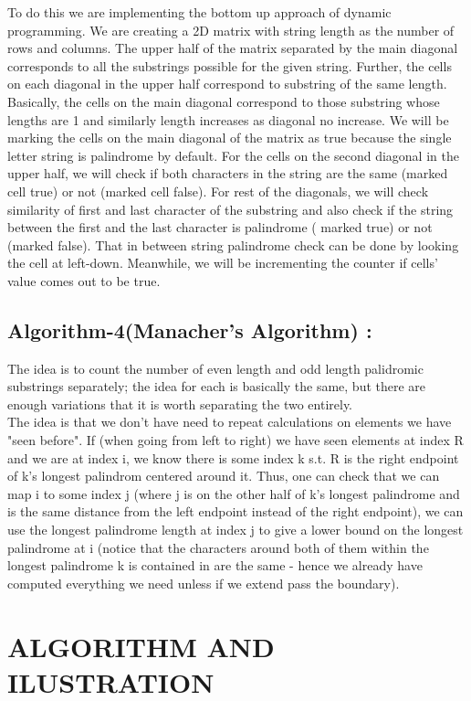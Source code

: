 \documentclass[conference]{IEEEtran}
\begin{document}
To do this we are implementing the bottom up approach of dynamic programming. We are creating a 2D matrix with string length as the number of rows and columns. The upper half of the matrix separated by the main diagonal corresponds to all the substrings possible for the given string. Further, the cells on each diagonal in the upper half correspond to substring of the same length. Basically, the cells on the main diagonal correspond to those substring whose lengths are 1 and similarly length increases as diagonal no increase. We will be marking the cells on the main diagonal of the matrix as true because the single letter string is palindrome by default. For the cells on the second diagonal in the upper half, we will check if both characters in the string are the same (marked cell true) or not (marked cell false). For rest of the diagonals, we will check similarity of first and last character of the substring and also check if the string
between the first and the last character is palindrome ( marked true) or not (marked false). That in between string palindrome check can be done by looking the cell at left-down. Meanwhile, we will be incrementing the counter if cells’ value comes out to be true.

\bigskip\subsection{Algorithm-4(Manacher’s Algorithm) :}

The idea is to count the number of even length and odd length palidromic substrings separately; the idea for each is basically the same, but there are enough variations that it is worth separating the two entirely.\\
The idea is that we don't have need to repeat calculations on elements we have "seen before". If (when going from left to right) we have seen elements at index R and we are at index i, we know there is some index k s.t. R is the right endpoint of k's longest palindrom centered around it. Thus, one can check that we can map i to some index j (where j is on the other half of k's longest palindrome and is the same distance from the left endpoint instead of the right endpoint), we can use the longest palindrome length at index j to give a lower bound on the longest palindrome at i (notice that the characters around both of them within the longest palindrome k is contained in are the same - hence we already have computed everything we need unless if we extend pass the boundary).

\bigskip\section{ALGORITHM AND ILUSTRATION}
\end{document}
